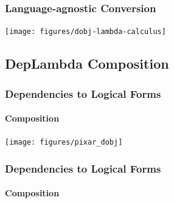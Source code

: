 \documentclass[mathserif,12pt]{beamer}
\newcommand \ignore[1]{}
\newcommand{\hlight}[1]{{\color{blue!80} #1}}
\begin{document}
\begin{frame}
\frametitle{Language-agnostic Conversion}
\vspace{2em}
\texttt{[image: figures/dobj-lambda-calculus]}
\end{frame} 

\subsection{DepLambda Composition}
\begin{frame}
\frametitle{Dependencies to Logical Forms}
\framesubtitle{Composition}
\begin{center}
\texttt{[image: figures/pixar\_dobj]} 

\vspace{0.8cm}

\end{center}
\end{frame}

\begin{frame}
\frametitle{Dependencies to Logical Forms}
\framesubtitle{Composition}
\begin{center}

\vspace{0.8cm}

\end{center}
\end{frame}

\ignore{
\begin{frame}
\frametitle{In a nutshell}
\large

Dependency tree is a series of \hlight{compositions}

\vspace{2em}
Dependency label defines the \hlight{composition function}

\vspace{2em}
Each function takes two semantic \hlight{sub-expressions}

\vspace{2em}
Returns semantics of the \hlight{larger expression}
\end{frame}
}
\end{document}
